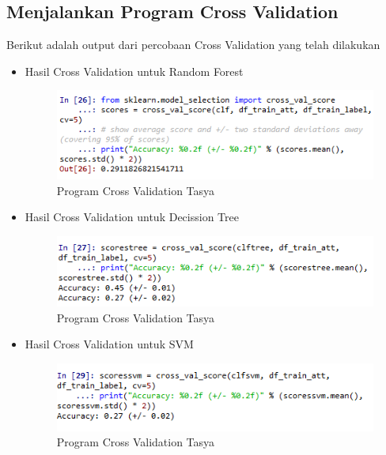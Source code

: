 \subsection{Menjalankan Program Cross Validation}
Berikut adalah output dari percobaan  Cross Validation yang telah dilakukan
\begin{itemize}
\item Hasil Cross Validation untuk  Random Forest
\begin{figure}[ht]
\centering
\includegraphics[scale=0.5]{figures/cv1.png}
\caption{Program Cross Validation Tasya}
\label{Praktek}
\end{figure}

\item Hasil Cross Validation untuk Decission Tree
\begin{figure}[ht]
\centering
\includegraphics[scale=0.5]{figures/cv2.png}
\caption{Program Cross Validation Tasya}
\label{Praktek}
\end{figure}

\item Hasil Cross Validation untuk SVM
\begin{figure}[ht]
\centering
\includegraphics[scale=0.5]{figures/cv3.png}
\caption{Program Cross Validation Tasya}
\label{Praktek}
\end{figure}
\end{itemize}

